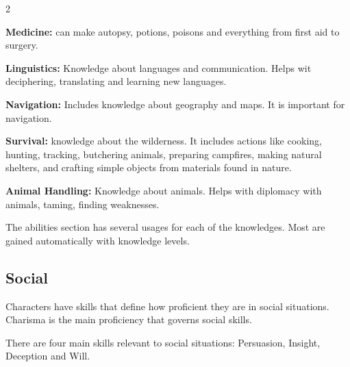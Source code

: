 \begin{multicols}{2}
\begin{proplist}
    \item \textbf{Medicine:} can make autopsy, potions, poisons and everything from first aid to surgery.

    \item \textbf{Linguistics:} Knowledge about languages and communication. Helps wit deciphering, translating and learning new languages.
    
    \item \textbf{Navigation:} Includes knowledge about geography and maps. It is important for navigation.  
    \item \textbf{Survival:} knowledge about the wilderness. It includes actions like cooking, hunting, tracking, butchering animals, preparing campfires, making natural shelters, and crafting simple objects from materials found in nature.
    \item \textbf{Animal Handling:} Knowledge about animals. Helps with diplomacy with animals, taming, finding weaknesses.
\end{proplist}
\noindent

The abilities section has several usages for each of the knowledges. Most are gained automatically with knowledge levels.


\subsection{Social}

Characters have skills that define how proficient they are in social situations. Charisma is the main proficiency that governs social skills.

There are four main skills relevant to social situations: Persuasion, Insight, Deception and Will.




\end{multicols}
